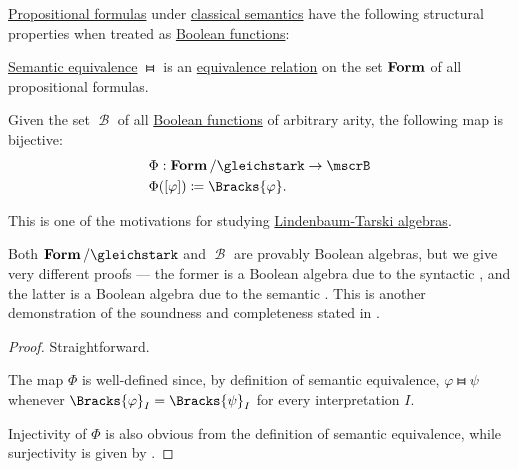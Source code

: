 \begin{proposition}\label{thm:propositional_formulas_and_boolean_functions}
  \hyperref[def:propositional_syntax/formula]{Propositional formulas} under \hyperref[def:propositional_semantics/classical]{classical semantics} have the following structural properties when treated as \hyperref[def:boolean_function]{Boolean functions}:

  \begin{thmenum}
     \hyperref[def:semantic_equivalence]{Semantic equivalence} \( \gleichstark \) is an \hyperref[def:equivalence_relation]{equivalence relation} on the set \( \op*{Form} \) of all propositional formulas.

     Given the set \( \mscrB \) of all \hyperref[def:boolean_function]{Boolean functions} of arbitrary arity, the following map is bijective:
    \begin{equation*}
      \begin{aligned}
        &\Phi: \op*{Form} / {\gleichstark} \to \mscrB \\
        &\Phi([\varphi]) \coloneqq \Bracks{\varphi}.
      \end{aligned}
    \end{equation*}
  \end{thmenum}
\end{proposition}
\begin{comments}
  \item This is one of the motivations for studying \hyperref[def:lindenbaum_tarski_algebra]{Lindenbaum-Tarski algebras}.
  \item Both \( \op*{Form} / {\gleichstark} \) and \( \mscrB \) are provably Boolean algebras, but we give very different proofs --- the former is a Boolean algebra due to the syntactic , and the latter is a Boolean algebra due to the semantic . This is another demonstration of the soundness and completeness stated in .
\end{comments}
\begin{proof}
   Straightforward.

   The map \( \Phi \) is well-defined since, by definition of semantic equivalence, \( \varphi \gleichstark \psi \) whenever \( \Bracks{\varphi}_I = \Bracks{\psi}_I \) for every interpretation \( I \).

  Injectivity of \( \Phi \) is also obvious from the definition of semantic equivalence, while surjectivity is given by .
\end{proof}
